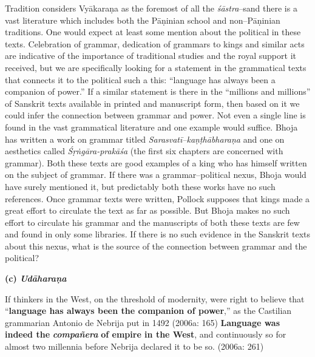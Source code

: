 Tradition considers Vyākaraṇa as the foremost of all the \textit{śāstra}–s\break and there is a vast literature which includes both the Pāṇinian school and non–Pāṇinian traditions. One would expect at least some mention about the political in these texts. Celebration of grammar, dedication of grammars to kings and similar acts are indicative of the importance of traditional studies and the royal support it received, but we are specifically looking for a statement in the grammatical texts that connects it to the political such a this: “language has always been a companion of power.” If a similar statement is there in the “millions and millions” of Sanskrit texts available in printed and manuscript form, then based on it we could infer the connection between grammar and power. Not even a single line is found in the vast grammatical literature and one example would suffice. Bhoja has written a work on grammar titled \textit{Sarasvatī–kaṇṭhābharaṇa} and one on aesthetics called \textit{Śṛṅgāra-prakāśa} (the first six chapters are concerned with grammar). Both these texts are good examples of a king who has himself written on the subject of grammar. If there was a grammar–political nexus, Bhoja would have surely mentioned it, but predictably both these works have no such references. Once grammar texts were written, Pollock supposes that kings made a great effort to circulate the text as far as possible. But Bhoja makes no such effort to circulate his grammar and the manuscripts of both these texts are few and found in only some libraries. If there is no such evidence in the Sanskrit texts about this nexus, what is the source of the connection between grammar and the political?

\textbf{(c) \textit{Udāharaṇa}}

\begin{myquote}
If thinkers in the West, on the threshold of modernity, were right to believe that “\textbf{language has always been the companion of power},” as the Castilian grammarian Antonio de Nebrija put in 1492 (2006a: 165) \textbf{Language was indeed the} {\it {\bfseries compañera}} \textbf{of empire in the West}, and continuously so for almost two millennia before Nebrija declared it to be so. (2006a: 261)
\end{myquote}

